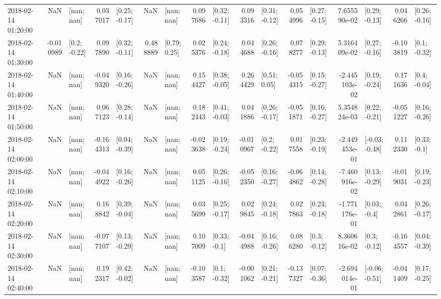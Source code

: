 \begin{tabular}{lrlrlrlrlrlrlrlrl}
2018-02-14 01:20:00 &       NaN &      [nan; nan] &  0.037017 &   [0.25; -0.17] &       NaN &      [nan; nan] &  0.097686 &   [0.32; -0.11] &  0.093316 &   [0.31; -0.12] &  0.054996 &   [0.27; -0.15] &  7.655590e-02 &   [0.29; -0.13] &  0.046266 &   [0.26; -0.16] \\
2018-02-14 01:30:00 & -0.010989 &    [0.2; -0.22] &  0.097890 &   [0.32; -0.11] &  0.488889 &    [0.79; 0.25] &  0.025376 &   [0.24; -0.18] &  0.044688 &   [0.26; -0.16] &  0.078277 &   [0.29; -0.13] &  5.316409e-02 &   [0.27; -0.16] & -0.103819 &    [0.1; -0.32] \\
2018-02-14 01:40:00 &       NaN &      [nan; nan] & -0.049320 &   [0.16; -0.26] &       NaN &      [nan; nan] &  0.154427 &   [0.38; -0.05] &  0.264429 &    [0.51; 0.05] & -0.054315 &   [0.15; -0.27] & -2.445103e-02 &   [0.19; -0.24] &  0.171636 &    [0.4; -0.04] \\
2018-02-14 01:50:00 &       NaN &      [nan; nan] &  0.067123 &   [0.28; -0.14] &       NaN &      [nan; nan] &  0.182443 &   [0.41; -0.03] &  0.041886 &   [0.26; -0.17] & -0.051871 &   [0.16; -0.27] &  5.354824e-03 &   [0.22; -0.21] & -0.051227 &   [0.16; -0.26] \\
2018-02-14 02:00:00 &       NaN &      [nan; nan] & -0.164313 &   [0.04; -0.39] &       NaN &      [nan; nan] & -0.023638 &   [0.19; -0.24] & -0.010967 &    [0.2; -0.22] &  0.017558 &   [0.23; -0.19] & -2.449453e-01 &  [-0.03; -0.48] &  0.112330 &    [0.33; -0.1] \\
2018-02-14 02:10:00 &       NaN &      [nan; nan] & -0.044922 &   [0.16; -0.26] &       NaN &      [nan; nan] &  0.051125 &   [0.26; -0.16] & -0.052350 &   [0.16; -0.27] & -0.064862 &   [0.14; -0.28] & -7.460916e-02 &   [0.13; -0.29] & -0.019031 &   [0.19; -0.23] \\
2018-02-14 02:20:00 &       NaN &      [nan; nan] &  0.168842 &   [0.39; -0.04] &       NaN &      [nan; nan] &  0.035699 &   [0.25; -0.17] &  0.029845 &   [0.24; -0.18] &  0.027863 &   [0.24; -0.18] & -1.771176e-01 &    [0.03; -0.4] &  0.042861 &   [0.26; -0.17] \\
2018-02-14 02:30:00 &       NaN &      [nan; nan] & -0.077107 &   [0.13; -0.29] &       NaN &      [nan; nan] &  0.107009 &    [0.33; -0.1] & -0.044988 &   [0.16; -0.26] &  0.086280 &    [0.3; -0.12] &  8.360616e-02 &    [0.3; -0.12] & -0.164557 &   [0.04; -0.39] \\
2018-02-14 02:40:00 &       NaN &      [nan; nan] &  0.192317 &   [0.42; -0.02] &       NaN &      [nan; nan] & -0.103587 &    [0.1; -0.32] & -0.001062 &   [0.21; -0.21] & -0.137327 &   [0.07; -0.36] & -2.694014e-01 &  [-0.06; -0.51] & -0.041409 &   [0.17; -0.25] \\

\end{tabular}
